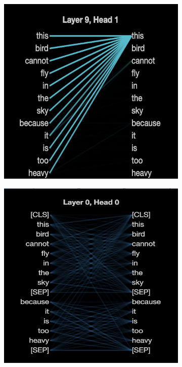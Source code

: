 \documentclass[]{article}
\begin{document}
\begin{figure}[!h]
\begin{subfigure}[b]{0.32\textwidth}
    \end{subfigure}
    \hfill
    \begin{subfigure}[b]{0.32\textwidth}
        \includegraphics[width=\textwidth]{FIGS/gpt2_model_L9H1.png}
    \end{subfigure}
    \vfill
    \begin{subfigure}[b]{0.32\textwidth}
        \includegraphics[width=\textwidth]{FIGS/bert_model_L0H0.png}

\end{subfigure}
\end{figure}
\end{document}
